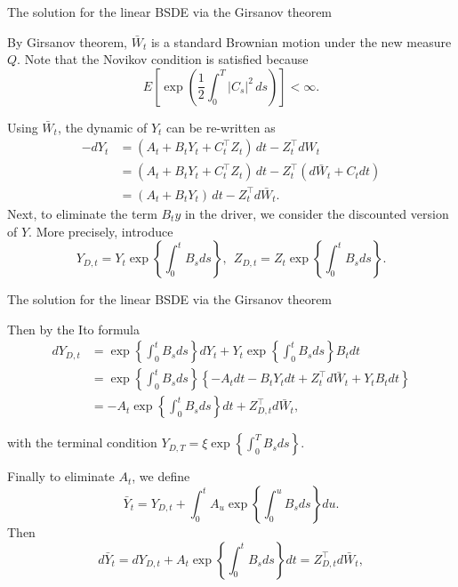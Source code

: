 \documentclass{beamer}
\begin{document}
\begin{frame}{The solution for the linear BSDE via the Girsanov theorem}

    {\footnotesize \footnotesize
   By Girsanov theorem, \(\bar{W}_{t}\) is a standard Brownian motion under the new measure \(Q\). Note that the Novikov condition is satisfied because
\[
E\left[\exp\left(\frac{1}{2}\int_{0}^{T}|C_{s}|^{2}\,ds\right)\right]<\infty.
\]

 \pause Using \(\bar{W}_{t}\), the dynamic of \(Y_{t}\) can be re-written as
\begin{align*}
    -dY_{t} &= (A_{t}+B_{t}Y_{t}+C_{t}^{\top}Z_{t})\,dt-Z_{t}^{\top}dW_{t}\\
    &= (A_{t}+B_{t}Y_{t}+C_{t}^{\top}Z_{t})\,dt-Z_{t}^{\top}(d\bar{W}_{t}+ C_{t}dt)\\
    &= (A_{t}+B_{t}Y_{t})\,dt-Z_{t}^{\top}d\bar{W}_{t}.
\end{align*}
 \pause Next, to eliminate the term \(B_{t}y\) in the driver, we consider the discounted version of \(Y\). More precisely, introduce
\[
Y_{D,t}=Y_{t}\exp\left\{\int_{0}^{t}B_{s}ds\right\},\ \ Z_{D,t}=Z_{t}\exp\left\{ \int_{0}^{t}B_{s}ds\right\}.
\]

    }
    
\end{frame}

\begin{frame}{The solution for the linear BSDE via the Girsanov theorem}

    {\footnotesize \footnotesize
    Then by the Ito formula
    \begin{align*}
        dY_{D,t} &= \exp\left\{\int_{0}^{t}B_{s}ds\right\}dY_{t}
        +Y_{t}\exp\left\{\int_ {0}^{t}B_{s}ds\right\}B_{t}dt\\
        &= \exp\left\{\int_{0}^{t}B_{s}ds\right\}\left\{-A_{t}dt
        -B_{t}Y_{t}dt +Z_{t}^{\top}d\bar{W}_{t}+Y_{t}B_{t}dt\right\}\\
        & = -A_{t}\exp\left\{\int_{0}^{t}B_{s}ds\right\}dt+Z_{D,t}^{\top}d \bar{W}_{t},
    \end{align*}
\par with the terminal condition $Y_{D,T}=\xi\exp\left\{\int_{0}^{T}B_{s}ds\right\}.$
\par  \pause Finally to eliminate \(A_{t}\), we define
\[
\bar{Y}_{t}=Y_{D,t}+\int_{0}^{t}A_{u}\exp\left\{\int_{0}^{u}B_{s}ds\right\}du.
\]
Then
\[
d\bar{Y}_{t} = dY_{D,t}+A_{t}\exp\left\{\int_{0}^{t}B_{s}ds\right\}dt= Z_{D,t}^{\top}d\bar{W}_{t},
\]

    }
    
\end{frame}
\end{document}
